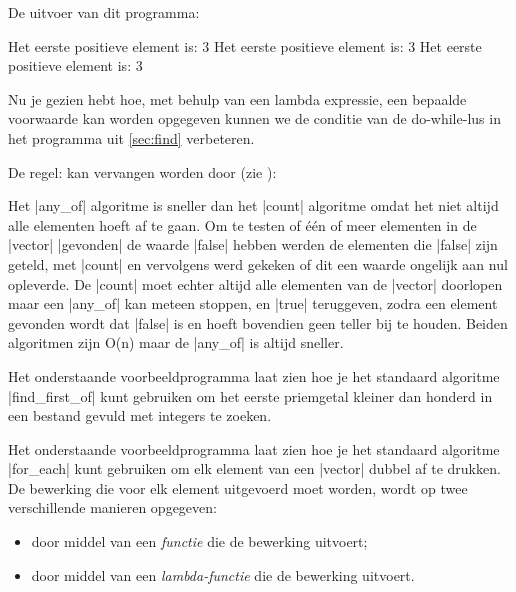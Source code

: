 \begin{cpplstShortInline}

De uitvoer van dit programma:
\begin{coutput}
Het eerste positieve element is: 3
Het eerste positieve element is: 3
Het eerste positieve element is: 3
\end{coutput}

\label{pag:any_of}
Nu je gezien hebt hoe, met behulp van een lambda expressie, een bepaalde voorwaarde kan worden opgegeven kunnen we de conditie van de do\hyp{}while\hyp{}lus in het programma uit \cref{sec:find} verbeteren.

De regel:
kan vervangen worden door (zie ):

Het |any_of| algoritme is sneller dan het |count| algoritme omdat het niet altijd alle elementen hoeft af te gaan.
Om te testen of één of meer elementen in de |vector| |gevonden| de waarde |false| hebben werden de elementen die |false| zijn geteld, met |count| en vervolgens werd gekeken of dit een waarde ongelijk aan nul opleverde.
De |count| moet echter altijd alle elementen van de |vector| doorlopen maar een |any_of| kan meteen stoppen, en |true| teruggeven, zodra een element gevonden wordt dat |false| is en hoeft bovendien geen teller bij te houden.
Beiden algoritmen zijn O(n) maar de |any_of| is altijd sneller.

\label{sec:findfirstof}
Het onderstaande voorbeeldprogramma  laat zien hoe je het standaard algoritme |find_first_of| kunt gebruiken om het eerste priemgetal kleiner dan honderd in een bestand gevuld met integers te zoeken.


\label{sec:foreach}
Het onderstaande voorbeeldprogramma  laat zien hoe je het standaard algoritme |for_each| kunt gebruiken om elk element van een |vector| dubbel af te drukken.
De bewerking die voor elk element uitgevoerd moet worden, wordt op twee verschillende manieren opgegeven:
\begin{itemize}
	\item door middel van een \emph{functie} die de bewerking uitvoert;
	\item door middel van een \emph{lambda\hyp{}functie} die de bewerking uitvoert.
\end{itemize}


\end{cpplstShortInline}
